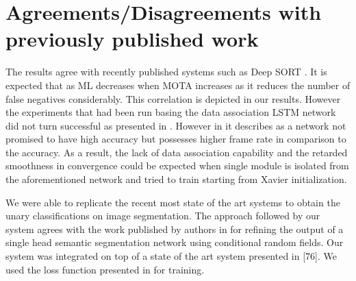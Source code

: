 \section{Agreements/Disagreements with previously published work}
The results agree with recently published systems such as Deep SORT \cite{DeepSiam:deepSort}. It is expected that as ML decreases when MOTA increases as it reduces the number of false negatives considerably. This correlation is depicted in our results.
However the experiments that had been run basing the data association LSTM network did not turn successful as presented in \cite{DeepSiam:MilanL0RS16}. However in \cite{DeepSiam:MilanL0RS16} it describes as a network not promised to have high accuracy but possesses higher frame rate in comparison to the accuracy. As a result, the lack of data association capability and the retarded smoothness in convergence could be expected when single module is isolated from the aforementioned network and tried to train starting from Xavier initialization.

We were able to replicate the recent most state of the art systems to obtain the unary classifications on image segmentation. The approach followed by our system agrees with the work published by authors in \cite{Zhen_ICCV15_CRFRNN} for refining the output of a single head semantic segmentation network using conditional random fields. Our system was integrated on top of a state of the art system presented in [76]. We used the loss function presented in \cite{Anurag17} for training.  
